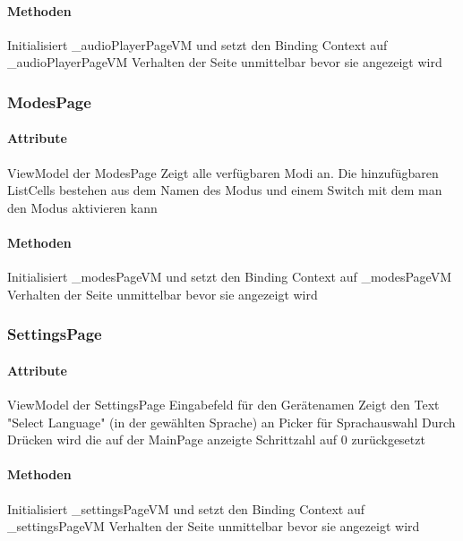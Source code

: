 \documentclass[../entwurf.tex]{subfiles}
\begin{document}
\paragraph{Methoden}

\begin{itemize}
	 Initialisiert \_audioPlayerPageVM und setzt den Binding Context 			auf \_audioPlayerPageVM
	 Verhalten der Seite unmittelbar bevor sie angezeigt wird
\end{itemize}

\subsubsection{ModesPage}

\paragraph{Attribute}
\begin{itemize}
	 ViewModel der ModesPage
	 Zeigt alle verfügbaren Modi an. Die hinzufügbaren ListCells bestehen aus dem Namen des Modus und einem Switch mit dem man den Modus aktivieren kann
\end{itemize}

\paragraph{Methoden}

\begin{itemize}
	 Initialisiert \_modesPageVM und setzt den Binding Context 			auf \_modesPageVM
	 Verhalten der Seite unmittelbar bevor sie angezeigt wird
\end{itemize}

\subsubsection{SettingsPage}
\paragraph{Attribute}

\begin{itemize}
	 ViewModel der SettingsPage
	 Eingabefeld für den Gerätenamen
	 Zeigt den Text "Select Language" (in der gewählten Sprache) an
	 Picker für Sprachauswahl
	 Durch Drücken wird die auf der MainPage anzeigte Schrittzahl auf 0 zurückgesetzt
\end{itemize}

\paragraph{Methoden}

\begin{itemize}
	 Initialisiert \_settingsPageVM und setzt den Binding Context 			auf \_settingsPageVM
	 Verhalten der Seite unmittelbar bevor sie angezeigt wird
\end{itemize}
\end{document}
